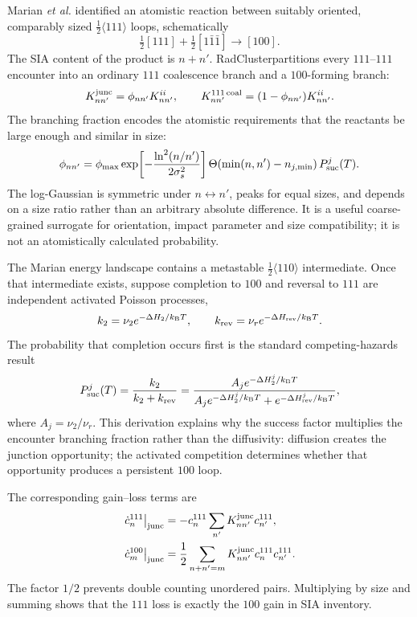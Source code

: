\documentclass[11pt,a4paper]{article}
\newcommand{\hkl}[1]{\langle #1\rangle}
\newcommand{\half}{\tfrac12}
\newcommand{\kb}{k_{\mathrm B}}
\newcommand{\rc}{\textsf{RadCluster}}
\begin{document}
Marian \emph{et al.} identified an atomistic reaction between suitably oriented, comparably sized $\half\hkl{111}$ loops, schematically
\begin{equation}
 \half[111]+\half[1\bar1\bar1]\longrightarrow[100].                   \label{eq:vector}
\end{equation}
The SIA content of the product is $n+n'$.  \rc partitions every $111$--$111$ encounter into an ordinary $111$ coalescence branch and a $100$-forming branch:
\begin{equation}
 K_{nn'}^{\rm junc}=\phi_{nn'}K_{nn'}^{ii},\qquad
 K_{nn'}^{111\,\rm coal}=(1-\phi_{nn'})K_{nn'}^{ii}.                  \label{eq:split}
\end{equation}
The branching fraction encodes the atomistic requirements that the reactants be large enough and similar in size:
\begin{equation}
 \phi_{nn'}=\phi_{\max}
 \exp\!\left[-\frac{\ln^2(n/n')}{2\sigma_s^2}\right]
 \Theta\!\left(\min(n,n')-n_{j,\min}\right)P_{\rm suc}^{j}(T).       \label{eq:phi}
\end{equation}
The log-Gaussian is symmetric under $n\leftrightarrow n'$, peaks for equal sizes, and depends on a size ratio rather than an arbitrary absolute difference.  It is a useful coarse-grained surrogate for orientation, impact parameter and size compatibility; it is not an atomistically calculated probability.

The Marian energy landscape contains a metastable $\half\hkl{110}$ intermediate.  Once that intermediate exists, suppose completion to $100$ and reversal to $111$ are independent activated Poisson processes,
\begin{equation}
 k_2=\nu_2e^{-\Delta H_2/\kb T},\qquad
 k_{\rm rev}=\nu_re^{-\Delta H_{\rm rev}/\kb T}.
\end{equation}
The probability that completion occurs first is the standard competing-hazards result
\begin{equation}
 P_{\rm suc}^{j}(T)=\frac{k_2}{k_2+k_{\rm rev}}
 =\frac{A_je^{-\Delta H_2^j/\kb T}}
 {A_je^{-\Delta H_2^j/\kb T}+e^{-\Delta H_{\rm rev}^j/\kb T}},         \label{eq:psuc}
\end{equation}
where $A_j=\nu_2/\nu_r$.  This derivation explains why the success factor multiplies the encounter branching fraction rather than the diffusivity: diffusion creates the junction opportunity; the activated competition determines whether that opportunity produces a persistent $100$ loop.

The corresponding gain--loss terms are
\begin{align}
 \left.\dot c_n^{111}\right|_{\rm junc}
 &=-c_n^{111}\sum_{n'}K_{nn'}^{\rm junc}c_{n'}^{111},                 \label{eq:jloss}\\
 \left.\dot c_m^{100}\right|_{\rm junc}
 &=\frac12\sum_{n+n'=m}K_{nn'}^{\rm junc}c_n^{111}c_{n'}^{111}.       \label{eq:jgain}
\end{align}
The factor $1/2$ prevents double counting unordered pairs.  Multiplying by size and summing shows that the $111$ loss is exactly the $100$ gain in SIA inventory.
\end{document}
